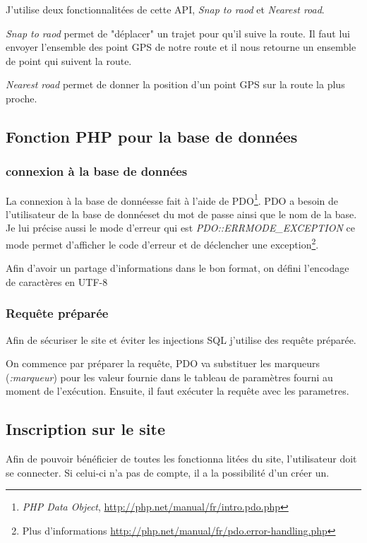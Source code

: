 \documentclass[a4paper]{article}
\newcommand{\bdd}{base de données}
\begin{document}
J'utilise deux fonctionnalitées de cette API, \emph{Snap to raod} et \emph{Nearest road}.

\emph{Snap to raod} permet de "déplacer" un trajet pour qu'il suive la route. Il faut lui envoyer l'ensemble des point GPS de notre route et il nous retourne un ensemble de point qui suivent la route.

\emph{Nearest road} permet de donner la position d'un point GPS sur la route la plus proche.

\subsection{Fonction PHP pour la \bdd}
\subsubsection{connexion à la \bdd}
La connexion à la \bdd se fait à l'aide de PDO\footnote{\emph{PHP Data Object}, \url{http://php.net/manual/fr/intro.pdo.php}}. PDO a besoin de l'utilisateur de la \bdd et du mot de passe ainsi que le nom de la base.
Je lui précise aussi le mode d'erreur qui est \emph{PDO::ERRMODE\_EXCEPTION} ce mode permet d'afficher le code d'erreur et de déclencher une exception\footnote{Plus d'informations \url{http://php.net/manual/fr/pdo.error-handling.php}}.

Afin d'avoir un partage d'informations dans le bon format, on défini l'encodage de caractères en UTF-8


\subsubsection{Requête préparée}
Afin de sécuriser le site et éviter les injections SQL j'utilise des requête préparée.

On commence par préparer la requête, PDO va substituer les marqueurs (\emph{:marqueur}) pour les valeur fournie dans le tableau de paramètres fourni au moment de l'exécution. Ensuite, il faut exécuter la requête avec les parametres.



\newpage
\subsection{Inscription sur le site}

Afin de pouvoir bénéficier de toutes les fonctionna litées du site, l'utilisateur doit se connecter. Si celui-ci n'a pas de compte, il a la possibilité d'un créer un. 
\end{document}
